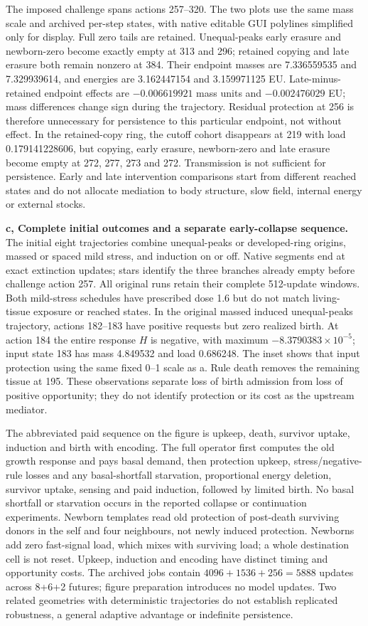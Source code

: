 The imposed challenge spans actions 257--320. The two plots use the same mass scale and archived per-step states, with native editable GUI polylines simplified only for display. Full zero tails are retained. Unequal-peaks early erasure and newborn-zero become exactly empty at 313 and 296; retained copying and late erasure both remain nonzero at 384. Their endpoint masses are 7.336559535 and 7.329939614, and energies are 3.162447154 and 3.159971125 EU. Late-minus-retained endpoint effects are $-0.006619921$ mass units and $-0.002476029$ EU; mass differences change sign during the trajectory. Residual protection at 256 is therefore unnecessary for persistence to this particular endpoint, not without effect. In the retained-copy ring, the cutoff cohort disappears at 219 with load 0.179141228606, but copying, early erasure, newborn-zero and late erasure become empty at 272, 277, 273 and 272. Transmission is not sufficient for persistence. Early and late intervention comparisons start from different reached states and do not allocate mediation to body structure, slow field, internal energy or external stocks.

\textbf{c, Complete initial outcomes and a separate early-collapse sequence.} The initial eight trajectories combine unequal-peaks or developed-ring origins, massed or spaced mild stress, and induction on or off. Native segments end at exact extinction updates; stars identify the three branches already empty before challenge action 257. All original runs retain their complete 512-update windows. Both mild-stress schedules have prescribed dose 1.6 but do not match living-tissue exposure or reached states. In the original massed induced unequal-peaks trajectory, actions 182--183 have positive requests but zero realized birth. At action 184 the entire response $H$ is negative, with maximum $-8.3790383\times10^{-5}$; input state 183 has mass 4.849532 and load 0.686248. The inset shows that input protection using the same fixed 0--1 scale as a. Rule death removes the remaining tissue at 195. These observations separate loss of birth admission from loss of positive opportunity; they do not identify protection or its cost as the upstream mediator.

The abbreviated paid sequence on the figure is upkeep, death, survivor uptake, induction and birth with encoding. The full operator first computes the old growth response and pays basal demand, then protection upkeep, stress/negative-rule losses and any basal-shortfall starvation, proportional energy deletion, survivor uptake, sensing and paid induction, followed by limited birth. No basal shortfall or starvation occurs in the reported collapse or continuation experiments. Newborn templates read old protection of post-death surviving donors in the self and four neighbours, not newly induced protection. Newborns add zero fast-signal load, which mixes with surviving load; a whole destination cell is not reset. Upkeep, induction and encoding have distinct timing and opportunity costs. The archived jobs contain $4096+1536+256=5888$ updates across 8+6+2 futures; figure preparation introduces no model updates. Two related geometries with deterministic trajectories do not establish replicated robustness, a general adaptive advantage or indefinite persistence.
